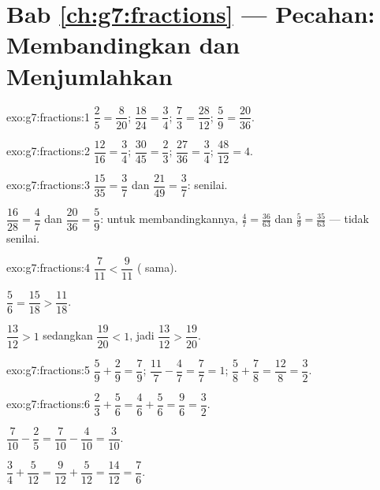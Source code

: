 \section*{Bab \ref{ch:g7:fractions} --- Pecahan: Membandingkan dan Menjumlahkan}

\begin{solution}{exo:g7:fractions:1}
$\dfrac{2}{5} = \dfrac{8}{20}$; \quad
$\dfrac{18}{24} = \dfrac{3}{4}$; \quad
$\dfrac{7}{3} = \dfrac{28}{12}$; \quad
$\dfrac{5}{9} = \dfrac{20}{36}$.
\end{solution}

\begin{solution}{exo:g7:fractions:2}
$\dfrac{12}{16} = \dfrac34$; \quad
$\dfrac{30}{45} = \dfrac23$; \quad
$\dfrac{27}{36} = \dfrac34$; \quad
$\dfrac{48}{12} = 4$.
\end{solution}

\begin{solution}{exo:g7:fractions:3}
$\dfrac{15}{35} = \dfrac37$ dan $\dfrac{21}{49} = \dfrac37$: senilai.

$\dfrac{16}{28} = \dfrac47$ dan $\dfrac{20}{36} = \dfrac59$: untuk
membandingkannya, $\frac47 = \frac{36}{63}$ dan
$\frac59 = \frac{35}{63}$ --- tidak senilai.
\end{solution}

\begin{solution}{exo:g7:fractions:4}
$\dfrac{7}{11} < \dfrac{9}{11}$ ( sama).

$\dfrac56 = \dfrac{15}{18} > \dfrac{11}{18}$.

$\dfrac{13}{12} > 1$ sedangkan $\dfrac{19}{20} < 1$, jadi
$\dfrac{13}{12} > \dfrac{19}{20}$.
\end{solution}

\begin{solution}{exo:g7:fractions:5}
$\dfrac59 + \dfrac29 = \dfrac79$; \quad
$\dfrac{11}{7} - \dfrac47 = \dfrac77 = 1$; \quad
$\dfrac58 + \dfrac78 = \dfrac{12}{8} = \dfrac32$.
\end{solution}

\begin{solution}{exo:g7:fractions:6}
$\dfrac23 + \dfrac56 = \dfrac46 + \dfrac56 = \dfrac96 = \dfrac32$.

$\dfrac{7}{10} - \dfrac25 = \dfrac{7}{10} - \dfrac{4}{10} =
\dfrac{3}{10}$.

$\dfrac34 + \dfrac{5}{12} = \dfrac{9}{12} + \dfrac{5}{12} =
\dfrac{14}{12} = \dfrac76$.
\end{solution}

